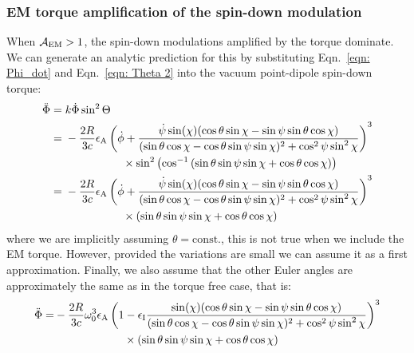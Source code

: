 \documentclass[../full_thesis/full_thesis.tex]{subfiles}
\begin{document}
\subsubsection{EM torque amplification of the spin-down modulation}
When $\mathcal{A}_{\mathrm{EM}} > 1$, the spin-down modulations amplified by
the torque dominate. We can generate an analytic prediction for this by substituting
Eqn.~\eqref{eqn: Phi_dot} and Eqn.~\eqref{eqn: Theta 2} into the vacuum point-dipole spin-down
torque:
\begin{align*}
\ddot{\Phi} = {} & k \dot{\Phi}\sin^{2}\Theta \\
            = {} & -\frac{2R}{3c} \epsA
                   \left(\dot{\phi}
                         +\frac{\dot{\psi}\sin(\chi)
                                (\cos\theta\sin\chi - \sin \psi \sin \theta \cos\chi)
                               }{
                                (\sin\theta \cos \chi - \cos \theta \sin \psi \sin \chi)^{2}
                         + \cos^{2}\psi \sin^{2} \chi}\right)^{3} \\
            &  \hspace{18mm}  \times  \sin^{2}\left(\cos^{-1}\left(
                     \sin\theta\sin\psi\sin\chi + \cos\theta\cos\chi\right)\right)\\
    = {} & -\frac{2R}{3c} \epsA
    \left(\dot{\phi}+\frac{\dot{\psi} \sin(\chi)(\cos\theta\sin\chi
          -\sin \psi \sin \theta \cos\chi)}
         {(\sin\theta \cos \chi - \cos \theta \sin \psi \sin \chi)^{2}
         + \cos^{2}\psi \sin^{2} \chi}\right)^{3} \\
   & \hspace{18mm} \times \left(\sin\theta\sin\psi\sin\chi + \cos\theta\cos\chi\right)
\end{align*}
where we are implicitly assuming $\theta=\mathrm{const.}$, this is not true
when we include the EM torque. However, provided the variations are small we
can assume it as a first approximation.  Finally, we also assume that the other
Euler angles are approximately the same as in the torque free case, that is:
 \begin{align}
\begin{split}
     \ddot{\Phi} =&-\frac{2R}{3c} \omega_{0}^{3}\epsA
     \left(1 -  \epsI\frac{ \sin(\chi)(\cos\theta\sin\chi - \sin \psi \sin \theta \cos\chi)
     }{(\sin\theta \cos \chi - \cos \theta \sin \psi \sin \chi)^{2} + \cos^{2}\psi \sin^{2} \chi}\right)^{3}\\
     &\hspace{22mm}\times\left(\sin\theta\sin\psi\sin\chi + \cos\theta\cos\chi\right)
     \label{eqn: Phi_dot EM}
\end{split}
\end{align}
\end{document}
